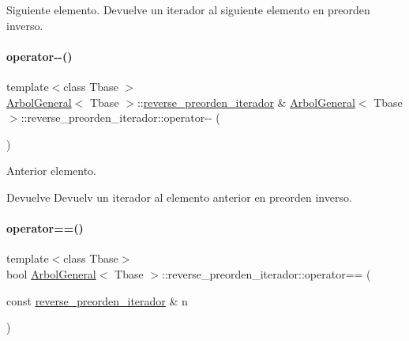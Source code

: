 Siguiente elemento.  Devuelve un iterador al siguiente elemento en preorden inverso. 

\hypertarget{classArbolGeneral_1_1reverse__preorden__iterador_abe501ae99cd71b927e21f882ec4bfec6}{}\label{classArbolGeneral_1_1reverse__preorden__iterador_abe501ae99cd71b927e21f882ec4bfec6} 
\paragraph{\texorpdfstring{operator-\/-\/()}{operator--()}}
{\footnotesize\ttfamily template$<$class Tbase $>$ \\
\hyperlink{classArbolGeneral}{Arbol\+General}$<$ Tbase $>$\+::\hyperlink{classArbolGeneral_1_1reverse__preorden__iterador}{reverse\+\_\+preorden\+\_\+iterador} \& \hyperlink{classArbolGeneral}{Arbol\+General}$<$ Tbase $>$\+::reverse\+\_\+preorden\+\_\+iterador\+::operator-\/-\/ (\begin{DoxyParamCaption}{ }\end{DoxyParamCaption})}



Anterior elemento. 

\begin{DoxyReturn}{Devuelve}
Devuelv un iterador al elemento anterior en preorden inverso. 
\end{DoxyReturn}
\hypertarget{classArbolGeneral_1_1reverse__preorden__iterador_a9ed2cebf9531952f629c3f3f20eccb3d}{}\label{classArbolGeneral_1_1reverse__preorden__iterador_a9ed2cebf9531952f629c3f3f20eccb3d} 
\paragraph{\texorpdfstring{operator==()}{operator==()}}
{\footnotesize\ttfamily template$<$class Tbase$>$ \\
bool \hyperlink{classArbolGeneral}{Arbol\+General}$<$ Tbase $>$\+::reverse\+\_\+preorden\+\_\+iterador\+::operator== (\begin{DoxyParamCaption}\item[{const \hyperlink{classArbolGeneral_1_1reverse__preorden__iterador}{reverse\+\_\+preorden\+\_\+iterador} \&}]{n }\end{DoxyParamCaption})\hspace{0.3cm}{\ttfamily [inline]}}



